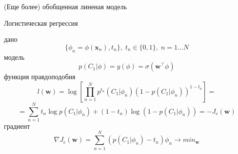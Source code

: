 \documentclass[10pt,a4paper]{beamer}
\begin{document}
\begin{frame}{(Еще более) обобщенная линеная модель}
\end{frame}


\begin{frame}{Логистическая регрессия}

дано
\[
\{\phi_n = \phi(\mathbf{x}_n), t_n\}, \; t_n \in \{ 0,1\}, \; n = 1 \ldots N
\]
модель
\[
p(C_1 | \phi) = y(\phi) = \sigma(\mathbf{w}^\top \phi)
\]
функция правдоподобия
\[
l(\mathbf{w}) = \log \left[ \prod_{n=1}^N p^{t_n}(C_1 | \phi_n) (1 - p(C_1 | \phi_n))^{1 - t_n}\right] = 
\]
\[
= \sum_{n=1}^N {t_n \log p(C_1 | \phi_n) + (1- t_n) \log (1 - p(C_1 | \phi_n))} = - J_e(\mathbf{w}) 
\]
градиент
\[
\nabla J_e(\mathbf{w}) = \sum_{n=1}^N (p(C_1 | \phi_n) - t_n) \phi_n \rightarrow min_{\mathbf{w}}
\]

\end{frame}

\end{document}
